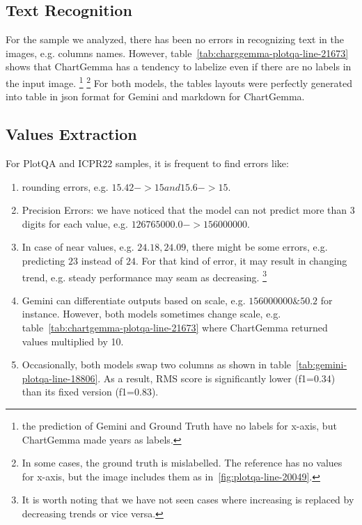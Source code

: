\documentclass[
	letterpaper, %
]{jdf}
\begin{document}
\subsection{Text Recognition}\label{ssect:qualitative-text-recognition}
For the sample we analyzed, there has been no errors in recognizing text in the images, e.g. columns names.
However, table~\ref{tab:charggemma-plotqa-line-21673} shows that ChartGemma has a tendency to labelize even if there are no labels in the input image.
\footnote{the prediction of Gemini and Ground Truth have no labels for x-axis, but ChartGemma made years as labels.}
\footnote{In some cases, the ground truth is mislabelled. The reference has no values for x-axis, but the image includes them as in~\ref{fig:plotqa-line-20049}.}
For both models, the tables layouts were perfectly generated into table in json format for Gemini and markdown for ChartGemma.

\subsection{Values Extraction}\label{ssect:values-extraction}
For PlotQA and ICPR22 samples, it is frequent to find errors like:
\begin{enumerate}
         \item rounding errors, e.g. $15.42->15 and 15.6->15$.
         \item Precision Errors: we have noticed that the model can not predict more than 3 digits for each value, e.g. $126765000.0->156000000$.
         \item In case of near values, e.g. $24.18, 24.09$, there might be some errors, e.g. predicting $23$ instead of $24$.
             For that kind of error, it may result in changing trend, e.g. steady performance may seam as decreasing.
             \footnote{It is worth noting that we have not seen cases where increasing is replaced by decreasing trends or vice versa.}
             \item Gemini can differentiate outputs based on scale, e.g. $156000000 \& 50.2$ for instance.
                 However, both models sometimes change scale, e.g. table~\ref{tab:chartgemma-plotqa-line-21673} where ChartGemma returned values multiplied by 10.
             \item Occasionally, both models swap two columns as shown in table~\ref{tab:gemini-plotqa-line-18806}.
                 As a result, RMS score is significantly lower (f1=0.34) than its fixed version (f1=0.83).
              \end{enumerate}
\end{document}
